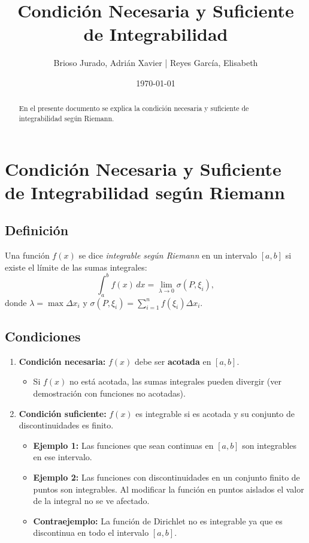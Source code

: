 \documentclass{article}
\title{Condición Necesaria y Suficiente de Integrabilidad}
\author{Brioso Jurado, Adrián Xavier | Reyes García, Elisabeth}
\date{\today}
\begin{document}
\maketitle

\begin{abstract}
En el presente documento se explica la condición necesaria y suficiente de integrabilidad según Riemann.
\end{abstract}

\section{Condición Necesaria y Suficiente de Integrabilidad según Riemann}

\subsection{Definición}
Una función \(f(x)\) se dice \textit{integrable según Riemann} en un intervalo \([a,b]\) si existe el límite de las sumas integrales:
\[
\int_{a}^{b} f(x) \, dx = \lim_{\lambda \to 0} \sigma(P, \xi_i),
\]
donde \( \lambda = \max \Delta x_i \) y \( \sigma(P, \xi_i) = \sum_{i=1}^{n} f(\xi_i) \Delta x_i \).

\subsection{Condiciones}
\begin{enumerate}
    \item \textbf{Condición necesaria:} \( f(x) \) debe ser \textbf{acotada} en \([a, b]\).
    \begin{itemize}
            \item Si \( f(x) \) no está acotada, las sumas integrales pueden divergir (ver demostración con funciones no acotadas).
    \end{itemize}

    \item \textbf{Condición suficiente:} \( f(x) \) es integrable si es acotada y su conjunto de discontinuidades es finito.
    \begin{itemize}
        \item \textbf{Ejemplo 1:} Las funciones que sean continuas en \([a, b]\) son integrables en ese intervalo.

        \item \textbf{Ejemplo 2:} Las funciones con discontinuidades en un conjunto finito de puntos son integrables. Al modificar la función en  puntos aislados el valor de la integral no se ve afectado.

        \item \textbf{Contraejemplo:} La función de Dirichlet no es integrable ya que es discontinua en todo el intervalo \([a, b]\).

    \end{itemize}
\end{enumerate}
\end{document}
